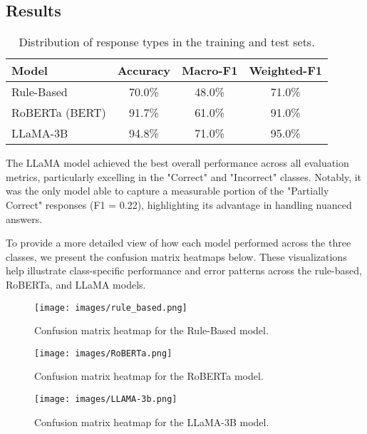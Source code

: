 \documentclass[11pt]{article}
\begin{document}
\subsection{Results}
\begin{table}[h]
\centering
\begin{adjustbox}{width=\columnwidth}
\begin{tabular}{lccc}
\hline
\textbf{Model} & \textbf{Accuracy} & \textbf{Macro-F1} & \textbf{Weighted-F1} \\
\hline
Rule-Based & 70.0\% & 48.0\% & 71.0\% \\
RoBERTa (BERT) & 91.7\% & 61.0\% & 91.0\% \\
LLaMA-3B & 94.8\% & 71.0\% & 95.0\% \\
\hline
\end{tabular}
\end{adjustbox}
\caption{Distribution of response types in the training and test sets.}
\label{tab:data_distribution}
\end{table}

The LLaMA model achieved the best overall performance across all evaluation metrics, particularly excelling in the "Correct" and "Incorrect" classes. Notably, it was the only model able to capture a measurable portion of the "Partially Correct" responses (F1 = 0.22), highlighting its advantage in handling nuanced answers.

To provide a more detailed view of how each model performed across the three classes, we present the confusion matrix heatmaps below. These visualizations help illustrate class-specific performance and error patterns across the rule-based, RoBERTa, and LLaMA models.

\begin{figure}[H]
    \centering
    \texttt{[image: images/rule\_based.png]}
    \caption{Confusion matrix heatmap for the Rule-Based model.}
    \label{fig:rule_based}
\end{figure}

\begin{figure}[H]
    \centering
    \texttt{[image: images/RoBERTa.png]}
    \caption{Confusion matrix heatmap for the RoBERTa model.}
    \label{fig:roberta}
\end{figure}

\begin{figure}[H]
    \centering
    \texttt{[image: images/LLAMA-3b.png]}
    \caption{Confusion matrix heatmap for the LLaMA-3B model.}
    \label{fig:llama}
\end{figure}
\end{document}
